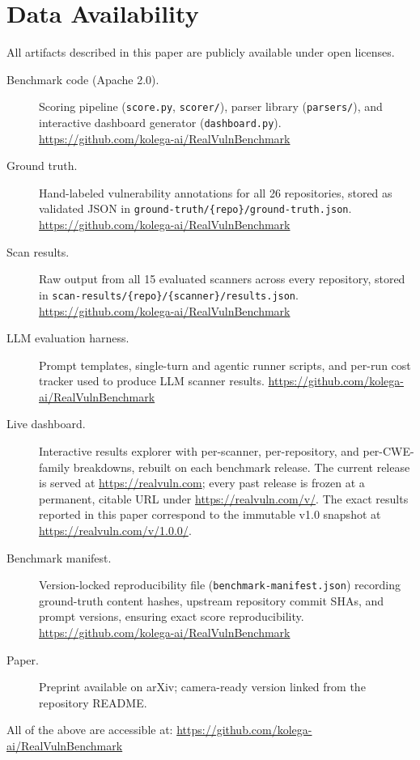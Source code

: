 \section{Data Availability}

All artifacts described in this paper are publicly available under open licenses.

\begin{description}
  \item[Benchmark code (Apache 2.0).]
    Scoring pipeline (\texttt{score.py}, \texttt{scorer/}), parser library
    (\texttt{parsers/}), and interactive dashboard generator
    (\texttt{dashboard.py}).
    \url{https://github.com/kolega-ai/RealVulnBenchmark}

  \item[Ground truth.]
    Hand-labeled vulnerability annotations for all 26 repositories, stored as
    validated JSON in \texttt{ground-truth/\{repo\}/ground-truth.json}.
    \url{https://github.com/kolega-ai/RealVulnBenchmark}

  \item[Scan results.]
    Raw output from all 15 evaluated scanners across every repository, stored
    in \texttt{scan-results/\{repo\}/\{scanner\}/results.json}.
    \url{https://github.com/kolega-ai/RealVulnBenchmark}

  \item[LLM evaluation harness.]
    Prompt templates, single-turn and agentic runner scripts, and per-run cost
    tracker used to produce LLM scanner results.
    \url{https://github.com/kolega-ai/RealVulnBenchmark}

  \item[Live dashboard.]
    Interactive results explorer with per-scanner, per-repository, and
    per-CWE-family breakdowns, rebuilt on each benchmark release.  The current
    release is served at \url{https://realvuln.com}; every past release is
    frozen at a permanent, citable URL under \url{https://realvuln.com/v/}.
    The exact results reported in this paper correspond to the immutable v1.0
    snapshot at \url{https://realvuln.com/v/1.0.0/}.

  \item[Benchmark manifest.]
    Version-locked reproducibility file (\texttt{benchmark-manifest.json})
    recording ground-truth content hashes, upstream repository commit SHAs,
    and prompt versions, ensuring exact score reproducibility.
    \url{https://github.com/kolega-ai/RealVulnBenchmark}

  \item[Paper.]
    Preprint available on arXiv; camera-ready version linked from the
    repository README.
\end{description}

\noindent All of the above are accessible at:
\url{https://github.com/kolega-ai/RealVulnBenchmark}
